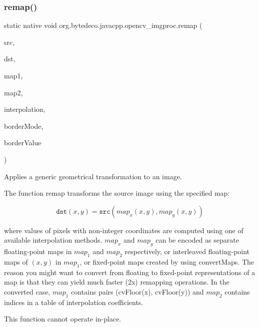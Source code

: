 \subsubsection{\texorpdfstring{remap()}{remap()}}
{\footnotesize\ttfamily static native void org.\+bytedeco.\+javacpp.\+opencv\+\_\+imgproc.\+remap (\begin{DoxyParamCaption}\item[{@By\+Val Mat}]{src,  }\item[{@By\+Val Mat}]{dst,  }\item[{@By\+Val Mat}]{map1,  }\item[{@By\+Val Mat}]{map2,  }\item[{int}]{interpolation,  }\item[{int}]{border\+Mode,  }\item[{@Const @By\+Ref(null\+Value=\char`\"{}cv\+::\+Scalar()\char`\"{}) Scalar}]{border\+Value }\end{DoxyParamCaption})\hspace{0.3cm}{\ttfamily [static]}}



Applies a generic geometrical transformation to an image. 

The function remap transforms the source image using the specified map\+: 

\[\texttt{dst} (x,y) = \texttt{src} (map_x(x,y),map_y(x,y))\] 

where values of pixels with non-\/integer coordinates are computed using one of available interpolation methods. $map_x$ and $map_y$ can be encoded as separate floating-\/point maps in $map_1$ and $map_2$ respectively, or interleaved floating-\/point maps of $(x,y)$ in $map_1$, or fixed-\/point maps created by using convert\+Maps. The reason you might want to convert from floating to fixed-\/point representations of a map is that they can yield much faster (2x) remapping operations. In the converted case, $map_1$ contains pairs (cv\+Floor(x), cv\+Floor(y)) and $map_2$ contains indices in a table of interpolation coefficients. 

This function cannot operate in-\/place. 


